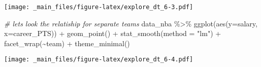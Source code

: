 \documentclass[
]{book}
\newenvironment{Shaded}{\begin{snugshade}}{\end{snugshade}}
\newcommand{\AttributeTok}[1]{\textcolor[rgb]{0.77,0.63,0.00}{#1}}
\newcommand{\AttributeTok}[1]{\textcolor[rgb]{0.13,0.29,0.53}{#1}}
\newcommand{\CommentTok}[1]{\textcolor[rgb]{0.56,0.35,0.01}{\textit{#1}}}
\newcommand{\FunctionTok}[1]{\textcolor[rgb]{0.00,0.00,0.00}{#1}}
\newcommand{\FunctionTok}[1]{\textcolor[rgb]{0.13,0.29,0.53}{\textbf{#1}}}
\newcommand{\NormalTok}[1]{#1}
\newcommand{\SpecialCharTok}[1]{\textcolor[rgb]{0.00,0.00,0.00}{#1}}
\newcommand{\SpecialCharTok}[1]{\textcolor[rgb]{0.81,0.36,0.00}{\textbf{#1}}}
\newcommand{\StringTok}[1]{\textcolor[rgb]{0.31,0.60,0.02}{#1}}
\begin{document}
\texttt{[image: \_main\_files/figure-latex/explore\_dt\_6-3.pdf]}

\begin{Shaded}
\begin{Highlighting}[]
\CommentTok{\# let\textquotesingle{}s look the relatiship for separate teams}
\NormalTok{data\_nba }\SpecialCharTok{\%\textgreater{}\%} 
  \FunctionTok{ggplot}\NormalTok{(}\FunctionTok{aes}\NormalTok{(}\AttributeTok{y=}\NormalTok{salary, }\AttributeTok{x=}\NormalTok{career\_PTS)) }\SpecialCharTok{+}
    \FunctionTok{geom\_point}\NormalTok{() }\SpecialCharTok{+} 
     \FunctionTok{stat\_smooth}\NormalTok{(}\AttributeTok{method =} \StringTok{"lm"}\NormalTok{) }\SpecialCharTok{+} 
        \FunctionTok{facet\_wrap}\NormalTok{(}\SpecialCharTok{\textasciitilde{}}\NormalTok{team) }\SpecialCharTok{+} 
       \FunctionTok{theme\_minimal}\NormalTok{()}
\end{Highlighting}
\end{Shaded}

\texttt{[image: \_main\_files/figure-latex/explore\_dt\_6-4.pdf]}
\end{document}
